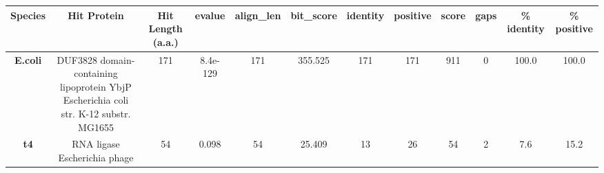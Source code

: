 \begin{tabular}{|c|c|c|c|c|c|c|c|c|c|c|c|} \hline
\textbf{Species} & \textbf{Hit Protein} & \textbf{Hit Length (a.a.)} & \textbf{evalue} & \textbf{align\_len} & \textbf{bit\_score} & \textbf{identity} & \textbf{positive} & \textbf{score} & \textbf{gaps} & \textbf{\% identity} & \textbf{\% positive} \\ \hline
\textbf{E.coli} & DUF3828 domain-containing lipoprotein YbjP Escherichia coli str. K-12 substr. MG1655 & 171 & 8.4e-129 & 171 & 355.525 & 171 & 171 & 911 & 0 & 100.0 & 100.0\\
\textbf{t4} & RNA ligase Escherichia phage  & 54 & 0.098 & 54 & 25.409 & 13 & 26 & 54 & 2 & 7.6 & 15.2\\
\hline \end{tabular}
